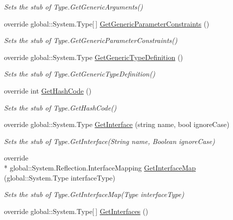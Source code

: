 \begin{DoxyCompactItemize}
\begin{DoxyCompactList}\small\item\em Sets the stub of Type.\-Get\-Generic\-Arguments()\end{DoxyCompactList}\item 
override global\-::\-System.\-Type\mbox{[}$\,$\mbox{]} \hyperlink{class_system_1_1_fakes_1_1_stub_type_acc84516dc8e82d9f038fb60ecdfda6f3}{Get\-Generic\-Parameter\-Constraints} ()
\begin{DoxyCompactList}\small\item\em Sets the stub of Type.\-Get\-Generic\-Parameter\-Constraints()\end{DoxyCompactList}\item 
override global\-::\-System.\-Type \hyperlink{class_system_1_1_fakes_1_1_stub_type_aee7c5620f927888203139bb5822957f9}{Get\-Generic\-Type\-Definition} ()
\begin{DoxyCompactList}\small\item\em Sets the stub of Type.\-Get\-Generic\-Type\-Definition()\end{DoxyCompactList}\item 
override int \hyperlink{class_system_1_1_fakes_1_1_stub_type_ac65c114bd922c40fb829fb6b1e187b18}{Get\-Hash\-Code} ()
\begin{DoxyCompactList}\small\item\em Sets the stub of Type.\-Get\-Hash\-Code()\end{DoxyCompactList}\item 
override global\-::\-System.\-Type \hyperlink{class_system_1_1_fakes_1_1_stub_type_a6f1a19c9b01a110d2eff0d90504e59ce}{Get\-Interface} (string name, bool ignore\-Case)
\begin{DoxyCompactList}\small\item\em Sets the stub of Type.\-Get\-Interface(\-String name, Boolean ignore\-Case)\end{DoxyCompactList}\item 
override \\*
global\-::\-System.\-Reflection.\-Interface\-Mapping \hyperlink{class_system_1_1_fakes_1_1_stub_type_aab2c4e91a331100a7805f43b894c4443}{Get\-Interface\-Map} (global\-::\-System.\-Type interface\-Type)
\begin{DoxyCompactList}\small\item\em Sets the stub of Type.\-Get\-Interface\-Map(\-Type interface\-Type)\end{DoxyCompactList}\item 
override global\-::\-System.\-Type\mbox{[}$\,$\mbox{]} \hyperlink{class_system_1_1_fakes_1_1_stub_type_a55e661b1cb9605d0b99af5ee1ea62bbb}{Get\-Interfaces} ()

\end{DoxyCompactItemize}
